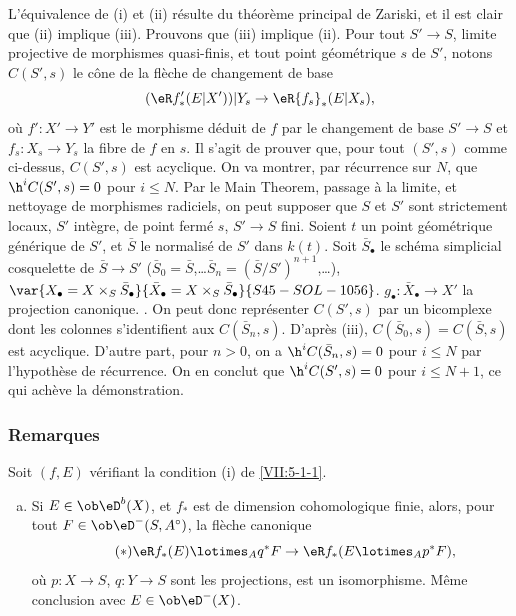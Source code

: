 L'équivalence de (i) et (ii) résulte du théorème principal de Zariski, 
et il est clair que (ii) implique (iii). Prouvons que (iii) implique (ii). Pour 
tout $S'\to S$, limite projective de morphismes quasi-finis, et tout point 
géométrique $s$ de $S'$, notons $C(S',s)$ le cône de la flèche de 
changement de base 
\[
  (\eR f_\ast'(E|X'))|Y_s \to \eR{f_s}_\ast (E|X_s) \text{,} 
\]
où $f':X'\to Y'$ est le morphisme déduit de $f$ par le changement de base 
$S'\to S$ et $f_s:X_s\to Y_s$ la fibre de $f$ en $s$. Il s'agit de prouver que, 
pour tout $(S',s)$ comme ci-dessus, $C(S',s)$ est acyclique. On va montrer, par 
récurrence sur $N$, que $\h^i C(S',s) = 0$ pour $i\leqslant N$. Par le Main 
Theorem, passage à la limite, et nettoyage de morphismes radiciels, on peut 
supposer que $S$ et $S'$ sont strictement locaux, $S'$ intègre, de point 
fermé $s$, $S'\to S$ fini. Soient $t$ un point géométrique générique 
de $S'$, et $\bar S$ le normalisé de $S'$ dans $k(t)$. Soit $\bar S_\bullet$ 
le schéma simplicial cosquelette de $\bar S\to S'$ 
($\bar S_0=\bar S$,\ldots $\bar S_n=(\bar S/S')^{n+1}$,\ldots), 
$\var{X_\bullet=X\times_S \bar S_\bullet}{\bar X_\bullet=X\times_S \bar S_\bullet}{S45-SOL-1056}$. $g_\bullet:\bar X_\bullet \to X'$ la 
projection canonique.  \cite[VIII 8]{sga4}. On 
peut donc représenter $C(S',s)$ par un bicomplexe dont les colonnes 
s'identifient aux $C(\bar S_n,s)$. D'après (iii), $C(\bar S_0,s)=C(\bar S,s)$ 
est acyclique. D'autre part, pour $n>0$, on a $\h^i C(\bar S_n,s)=0$ pour 
$i\leqslant N$ par l'hypothèse de récurrence. On en conclut que 
$\h^i C(S',s)=0$ pour $i\leqslant N+1$, ce qui achève la démonstration. 





\subsubsection{Remarques}\label{VII:5-1-2}

Soit $(f,E)$ vérifiant la condition (i) de \ref{VII:5-1-1}. 
\begin{enumerate}[a)]
  \item Si $E\in \ob \eD^b(X)$, et $f_\ast$ est de dimension cohomologique 
    finie, alors, pour tout $F\in \ob\eD^-(S,A^\circ)$, la flèche canonique 
    \begin{equation*}\tag{$*$}\label{VII:eq:5-1-1-1}
      \eR f_\ast(E)\lotimes_A q^\ast F \to \eR f_\ast(E\lotimes_A p^\ast F) \text{,} 
    \end{equation*}
    où $p:X\to S$, $q:Y\to S$ sont les projections, est un isomorphisme. 
    Même conclusion avec $E\in\ob\eD^-(X)$. 
\end{enumerate} 

